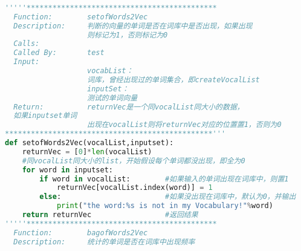 \begin{lstlisting}[language=python]
      
'''''******************************************** 
  Function:        setofWords2Vec 
  Description:     判断的向量的单词是否在词库中是否出现，如果出现 
                   则标记为1，否则标记为0 
  Calls:            
  Called By:       test 
  Input: 
                   vocabList： 
                   词库，曾经出现过的单词集合，即createVocalList 
                   inputSet： 
                   测试的单词向量 
  Return:          returnVec是一个同vocalList同大小的数据，
  如果inputset单词 
                   出现在vocalList则将returnVec对应的位置置1，否则为0 
************************************************'''  
def setofWords2Vec(vocalList,inputset):  
    returnVec = [0]*len(vocalList)         
    #同vocalList同大小的list，开始假设每个单词都没出现，即全为0  
    for word in inputset:                                          
        if word in vocalList:        #如果输入的单词出现在词库中，则置1     
            returnVec[vocalList.index(word)] = 1  
        else:                        #如果没出现在词库中，默认为0，并输出  
            print("the word:%s is not in my Vocabulary!"%word)  
    return returnVec                 #返回结果  
'''''********************************************
  Function:        bagofWords2Vec 
  Description:     统计的单词是否在词库中出现频率 
                  

\end{lstlisting}

